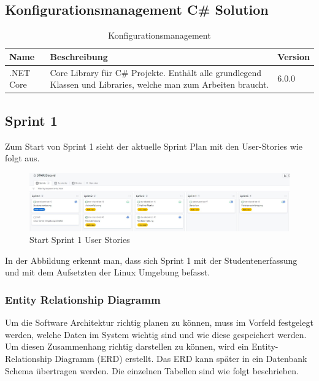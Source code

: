 \documentclass[a4paper, table]{article}
\begin{document}
\subsection{Konfigurationsmanagement C\# Solution}

\begin{table}[h]
    \centering
    \begin{tabular}{|l|p{20em}|l|}
        \hline
        \rowcolor[gray]{.9} Name & Beschreibung & Version \\
        \hline
        .NET Core & Core Library für C\# Projekte.
        Enthält alle grundlegend Klassen und Libraries, welche man zum Arbeiten braucht. & 6.0.0 \\
        \hline
    \end{tabular}
    \caption{Konfigurationsmanagement}
    \label{tab: Konfigurationsmanagement}
\end{table}

\newpage
\subsection{Sprint 1}
Zum Start von Sprint 1 sieht der aktuelle Sprint Plan mit den User-Stories wie folgt aus.
\begin{figure}[h]
    \centering
    \hspace*{-2cm}
    \includegraphics[width=1.3\textwidth]{img/Start_Sprint1_Stories.jpg}
    \caption{Start Sprint 1 User Stories}
    \label{fig:start_sprint_one}
\end{figure}

In der Abbildung erkennt man, dass sich Sprint 1 mit der Studentenerfassung und
mit dem Aufsetzten der Linux Umgebung befasst.

\subsubsection{Entity Relationship Diagramm}
Um die Software Architektur richtig planen zu können, muss im Vorfeld festgelegt werden,
welche Daten im System wichtig sind und wie diese gespeichert werden.
Um diesen Zusammenhang richtig darstellen zu können, wird ein Entity-Relationship Diagramm (ERD) erstellt.
Das ERD kann später in ein Datenbank Schema übertragen werden.
Die einzelnen Tabellen sind wie folgt beschrieben.
\end{document}
